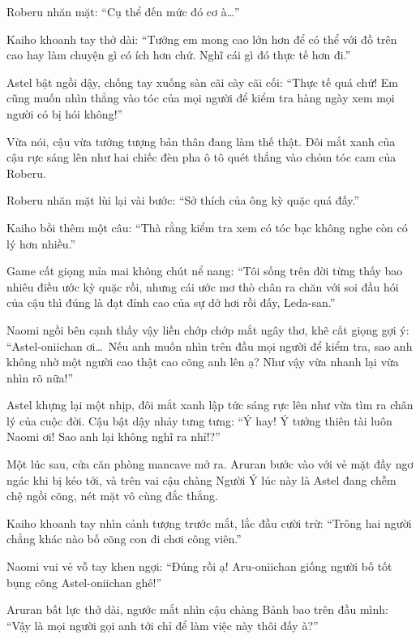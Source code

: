\documentclass[../main.tex]{subfiles}
\begin{document}

Roberu nhăn mặt: ``Cụ thể đến mức đó cơ à\dots''

Kaiho khoanh tay thở dài: ``Tưởng em mong cao lớn hơn để có thể với đồ trên cao hay làm chuyện gì có ích hơn chứ. Nghĩ cái gì đó thực tế hơn đi.''

Astel bật ngồi dậy, chống tay xuống sàn cãi cày cãi cối: ``Thực tế quá chứ! Em cũng muốn nhìn thẳng vào tóc của mọi người để kiểm tra hàng ngày xem mọi người có bị hói không!''

Vừa nói, cậu vừa tưởng tượng bản thân đang làm thế thật. Đôi mắt xanh của cậu rực sáng lên như hai chiếc đèn pha ô tô quét thẳng vào chỏm tóc cam của Roberu.


Roberu nhăn mặt lùi lại vài bước: ``Sở thích của ông kỳ quặc quá đấy.''

Kaiho bồi thêm một câu: ``Thà rằng kiểm tra xem có tóc bạc không nghe còn có lý hơn nhiều.''

Game cất giọng mỉa mai không chút nể nang: ``Tôi sống trên đời từng thấy bao nhiêu điều ước kỳ quặc rồi, nhưng cái ước mơ thò chân ra chăn với soi đầu hói của cậu thì đúng là đạt đỉnh cao của sự dở hơi rồi đấy, Leda-san.''

Naomi ngồi bên cạnh thấy vậy liền chớp chớp mắt ngây thơ, khẽ cất giọng gợi ý: ``Astel-oniichan ơi\dots\ Nếu anh muốn nhìn trên đầu mọi người để kiểm tra, sao anh không nhờ một người cao thật cao cõng anh lên ạ? Như vậy vừa nhanh lại vừa nhìn rõ nữa!''

Astel khựng lại một nhịp, đôi mắt xanh lập tức sáng rực lên như vừa tìm ra chân lý của cuộc đời. Cậu bật dậy nhảy tưng tưng: ``Ý hay! Ý tưởng thiên tài luôn Naomi ơi! Sao anh lại không nghĩ ra nhỉ!?''

\ct

Một lúc sau, cửa căn phòng mancave mở ra. Aruran bước vào với vẻ mặt đầy ngơ ngác khi bị kéo tới, và trên vai cậu chàng Người Ý lúc này là Astel đang chễm chệ ngồi cõng, nét mặt vô cùng đắc thắng.


Kaiho khoanh tay nhìn cảnh tượng trước mắt, lắc đầu cười trừ: ``Trông hai người chẳng khác nào bố cõng con đi chơi công viên.''

Naomi vui vẻ vỗ tay khen ngợi: ``Đúng rồi ạ! Aru-oniichan giống người bố tốt bụng cõng Astel-oniichan ghê!''

Aruran bất lực thở dài, ngước mắt nhìn cậu chàng Bảnh bao trên đầu mình: ``Vậy là mọi người gọi anh tới chỉ để làm việc này thôi đấy à?''
\end{document}
